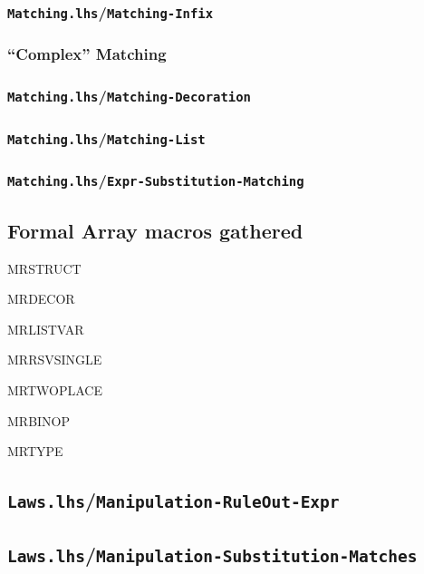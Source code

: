 \subsubsection{\texttt{Matching.lhs}/\texttt{Matching-Infix}}


\subsubsection{``Complex'' Matching}

\subsubsection{\texttt{Matching.lhs}/\texttt{Matching-Decoration}}


\subsubsection{\texttt{Matching.lhs}/\texttt{Matching-List}}


\subsubsection{\texttt{Matching.lhs}/\texttt{Expr-Substitution-Matching}}


\newpage
\subsection{Formal Array macros gathered}

MRSTRUCT
\MRSTRUCT

MRDECOR
\MRDECOR

MRLISTVAR
\MRLISTVAR

MRRSVSINGLE
\MRRSVSINGLE

MRTWOPLACE
\MRTWOPLACE

MRBINOP
\MRBINOP

MRTYPE
\MRTYPE

\newpage
\subsection{\texttt{Laws.lhs}/\texttt{Manipulation-RuleOut-Expr}}
%



\subsection{\texttt{Laws.lhs}/\texttt{Manipulation-Substitution-Matches}}


